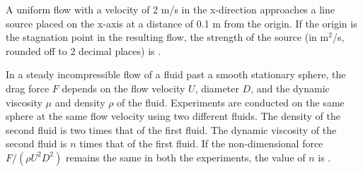 
\iffalse
    \title{Assignment}
    \author{EE24BTECH11063}
    \section{ce}
    \chapter{2012}
  \fi
    \item A uniform flow with a velocity of 2 m/s in the x-direction approaches a line source placed on the x-axis at a distance of 0.1 m from the origin. If the origin is the stagnation point in the resulting flow, the strength of the source (in m$^2$/s, rounded off to 2 decimal places) is \underline{\hspace{1cm}}.
\bigskip

\item In a steady incompressible flow of a fluid past a smooth stationary sphere, the drag force $F$ depends on the flow velocity $U$, diameter $D$, and the dynamic viscosity $\mu$ and density $\rho$ of the fluid. Experiments are conducted on the same sphere at the same flow velocity using two different fluids. The density of the second fluid is two times that of the first fluid. The dynamic viscosity of the second fluid is $n$ times that of the first fluid. If the non-dimensional force $F / (\rho U^2 D^2)$ remains the same in both the experiments, the value of $n$ is \underline{\hspace{1cm}}.
\bigskip

